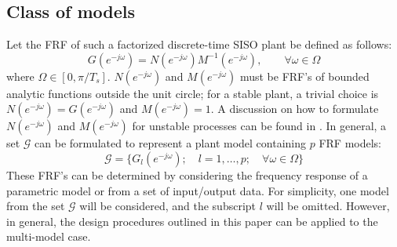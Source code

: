 \documentclass[journal]{IEEEtran}
\newcommand{\jo}{(e^{-j\omega})}
\begin{document}
\subsection{Class of models}
Let the FRF of such a factorized discrete-time SISO plant be defined as follows:
\begin{equation}\label{eq:setpmimo}
G\jo = N\jo M^{-1}\jo, \qquad \forall \omega \in \Omega
\end{equation}
where $\Omega \in [0,\pi/T_s]$. $N\jo$ and $M\jo$ must be FRF's of bounded analytic functions outside the unit circle; for a stable plant, a trivial choice is $N\jo=G\jo$ and $M\jo=1$. A discussion on how to formulate $N\jo$ and $M\jo$ for unstable processes can be found in \cite{KNZ16}. In general, a set $\mathcal{G}$ can be formulated to represent a plant model containing $p$ FRF models:
\begin{equation}
\mathcal{G} = \{G_l\jo; \quad l=1,\ldots,p; \quad \forall \omega \in \Omega\}
\end{equation} 
These FRF's can be determined by considering the frequency response of a parametric model or from a set of input/output data. For simplicity, one model from the set $\mathcal{G}$ will be considered, and the subscript $l$ will be omitted. However, in general, the design procedures outlined in this paper can be applied to the multi-model case. %
\end{document}
